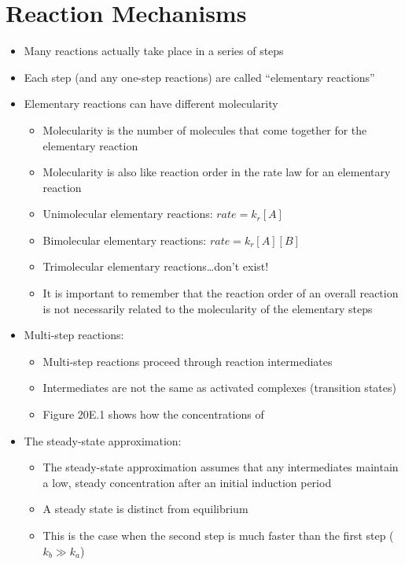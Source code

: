 \documentclass[12pt, openany, letterpaper]{memoir}
\begin{document}
\section{Reaction Mechanisms}
\begin{itemize}
	\item Many reactions actually take place in a series of steps
	\item Each step (and any one-step reactions) are called “elementary reactions”
	\item Elementary reactions can have different molecularity
	      \begin{itemize}
		      \item Molecularity is the number of molecules that come together for the elementary reaction
		      \item Molecularity is also like reaction order in the rate law for an elementary reaction
		      \item Unimolecular elementary reactions: \hspace{2em}$rate=k_r[A]$
		      \item Bimolecular elementary reactions: \hspace{2em}$rate=k_r[A][B]$
		      \item Trimolecular elementary reactions\ldots don't exist!
		      \item It is important to remember that the reaction order of an overall reaction is not necessarily related to the molecularity of the elementary steps
	      \end{itemize}
	\item Multi-step reactions:
	      \begin{itemize}
		      \item Multi-step reactions proceed through reaction intermediates
		      \item Intermediates are not the same as activated complexes (transition states)
		      \item Figure 20E.1 shows how the concentrations of
	      \end{itemize}
	\item The steady-state approximation:
	      \begin{itemize}
		      \item The steady-state approximation assumes that any intermediates maintain a low, steady concentration after an initial induction period
		      \item A steady state is distinct from equilibrium
		      \item This is the case when the second step is much faster than the first step ($k_b\gg k_a$)

\end{itemize}
\end{itemize}
\end{document}
